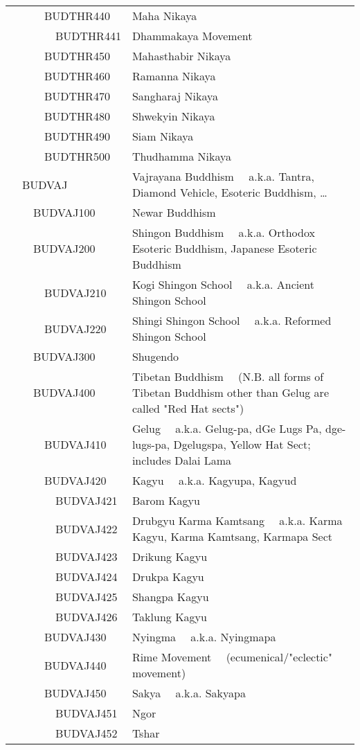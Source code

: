 \documentclass[12pt]{article}
\begin{document}
\begin{tiny}
\begin{center}
\begin{longtable}{|l|l|}
~~~~~~BUDTHR440 & Maha Nikaya \\
~~~~~~~~BUDTHR441 & Dhammakaya Movement \\
~~~~~~BUDTHR450 & Mahasthabir Nikaya \\
~~~~~~BUDTHR460 & Ramanna Nikaya \\
~~~~~~BUDTHR470 & Sangharaj Nikaya \\
~~~~~~BUDTHR480 & Shwekyin Nikaya \\
~~~~~~BUDTHR490 & Siam Nikaya \\
~~~~~~BUDTHR500 & Thudhamma Nikaya \\
~~BUDVAJ & Vajrayana Buddhism	~~a.k.a. Tantra, Diamond Vehicle, Esoteric Buddhism, … \\
~~~~BUDVAJ100 & Newar Buddhism \\
~~~~BUDVAJ200 & Shingon Buddhism	~~a.k.a. Orthodox Esoteric Buddhism, Japanese Esoteric Buddhism \\
~~~~~~BUDVAJ210 & Kogi Shingon School	~~a.k.a. Ancient Shingon School \\
~~~~~~BUDVAJ220 & Shingi Shingon School	~~a.k.a. Reformed Shingon School \\
~~~~BUDVAJ300 & Shugendo \\
~~~~BUDVAJ400 & Tibetan Buddhism	~~(N.B. all forms of Tibetan Buddhism other than Gelug are called "Red Hat sects") \\
~~~~~~BUDVAJ410 & Gelug	~~a.k.a. Gelug-pa, dGe Lugs Pa, dge-lugs-pa, Dgelugspa, Yellow Hat Sect; includes Dalai Lama \\
~~~~~~BUDVAJ420 & Kagyu	~~a.k.a. Kagyupa, Kagyud \\
~~~~~~~~BUDVAJ421 & Barom Kagyu \\
~~~~~~~~BUDVAJ422 & Drubgyu Karma Kamtsang	~~a.k.a. Karma Kagyu, Karma Kamtsang, Karmapa Sect \\
~~~~~~~~BUDVAJ423 & Drikung Kagyu \\
~~~~~~~~BUDVAJ424 & Drukpa Kagyu \\
~~~~~~~~BUDVAJ425 & Shangpa Kagyu \\
~~~~~~~~BUDVAJ426 & Taklung Kagyu \\
~~~~~~BUDVAJ430 & Nyingma	~~a.k.a. Nyingmapa \\
~~~~~~BUDVAJ440 & Rime Movement	~~(ecumenical/"eclectic" movement) \\
~~~~~~BUDVAJ450 & Sakya	~~a.k.a. Sakyapa \\
~~~~~~~~BUDVAJ451 & Ngor \\
~~~~~~~~BUDVAJ452 & Tshar \\

\end{longtable}
\end{center}
\end{tiny}
\end{document}
